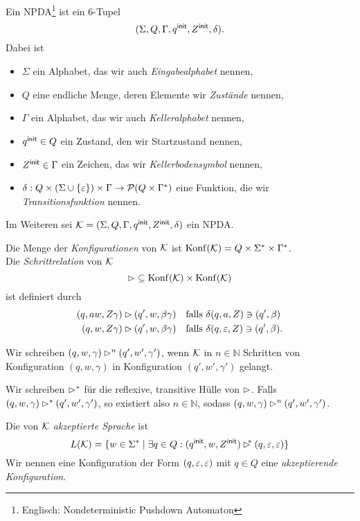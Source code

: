 \begin{Def}[name={[NPDA]}]
        Ein \ac{NPDA}\footnote{Englisch: Nondeterministic Pushdown Automaton} ist ein 6-Tupel 
        $$(\Sigma,Q,\Gamma,q^\mathsf{init},Z^\mathsf{init},\delta).$$
        Dabei ist
        \begin{itemize}
		\item $\Sigma$ ein Alphabet, das wir auch \emph{Eingabealphabet} nennen,
                \item $Q$ eine endliche Menge, deren Elemente wir \emph{Zustände} nennen,
                \item $\Gamma$ ein Alphabet, das wir auch \emph{Kelleralphabet} nennen,
                \item $q^\mathsf{init}\in Q$ ein Zustand, den wir Startzustand nennen,
                \item $Z^\mathsf{init}\in\Gamma$ ein Zeichen, das wir \emph{Kellerbodensymbol} nennen,
                \item $\delta: Q\x(\Sigma\cup\{\Eps\})\x\Gamma \-> \mathcal{P}(Q\x\Gamma^*)$ eine Funktion, die wir \emph{Transitionsfunktion} nennen. \qedhere
        \end{itemize}
\end{Def}
Im Weiteren sei $\mathcal{K}=(\Sigma,Q,\Gamma,q^\mathsf{init},Z^\mathsf{init},\delta)$ ein \ac{NPDA}.
\begin{Def}[name={[Menge der Konfigurationen eines \acs*{NPDA}]}]
        Die Menge der \emph{Konfigurationen} von $\mathcal{K}$ ist $\operatorname{Konf}(\mathcal{K}) = Q\times\Sigma^*\times\Gamma^*$.\\
        Die \emph{Schrittrelation} von $\mathcal{K}$
  \begin{displaymath}
    \mathop{\rhd} \subseteq \operatorname{Konf}(\mathcal{K}) \times \operatorname{Konf}(\mathcal{K}) 
  \end{displaymath}
  ist definiert durch
        \begin{align*}
                (q,aw,Z\gamma) &\rhd (q',w,\beta\gamma) &&\text{falls }\delta(q,a,Z)\ni(q',\beta)\\
                (q,w,Z\gamma) &\rhd (q',w,\beta\gamma) &&\text{falls }\delta(q,\varepsilon,Z)\ni(q',\beta).
        \end{align*}

  Wir schreiben $(q,w,\gamma) \rhd^n (q',w',\gamma')$, wenn $\mathcal{K}$ in $n \in \mathbb{N}$ Schritten von Konfiguration $(q,w,\gamma)$ in Konfiguration $(q',w',\gamma')$ gelangt.

  Wir schreiben ${\rhd^*}$ für die reflexive, transitive Hülle von ${\rhd}$.
  Falls $(q,w,\gamma) \rhd^* (q',w',\gamma')$, so existiert also $n \in \mathbb{N}$, sodass $(q,w,\gamma) \rhd^n (q',w',\gamma')$.
  
        Die von $\mathcal{K}$ \emph{akzeptierte Sprache} ist
  \begin{displaymath}
                L(\mathcal{K}) = \{ w\in\Sigma^* \mid \exists q\in Q: (q^\mathsf{init},w,Z^\mathsf{init}) \rhd^{\!\!*} (q,\varepsilon,\varepsilon) \}
  \end{displaymath}
  Wir nennen eine Konfiguration der Form $(q,\varepsilon,\varepsilon)$ mit $q\in Q$ eine \emph{akzeptierende Konfiguration}.
\end{Def}

